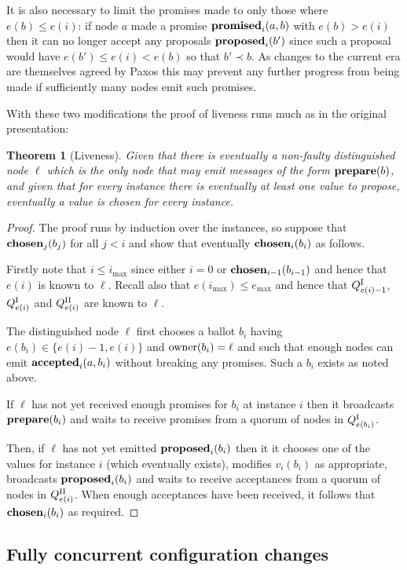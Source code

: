 \documentclass[journal]{IEEEtran}
\newtheorem{theorem}{Theorem}
\begin{document}
It is also necessary to limit the promises made to only those where $e(b) \le
e(i)$: if node $a$ made a promise $\mathbf{promised}_{i}(a,b)$ with $e(b) > e(i)$ then it
can no longer accept any proposals $\mathbf{proposed}_{i}(b')$ since such a proposal would
have $e(b') \le e(i) < e(b)$ so that $b' \prec b$. As changes to the current
era are themselves agreed by Paxos this may prevent any further progress from
being made if sufficiently many nodes emit such promises.

With these two modifications the proof of liveness runs much as in the original
presentation:

\begin{theorem}[Liveness] Given that there is eventually a non-faulty
distinguished node $\ell$ which is the only node that may emit messages of the
form $\mathbf{prepare}(b)$, and given that for every instance there is eventually at least
one value to propose, eventually a value is chosen for every instance.
\end{theorem}

\begin{proof} The proof runs by induction over the instances, so suppose that
$\mathbf{chosen}_{j}(b_j)$ for all $j < i$ and show that eventually $\mathbf{chosen}_{i}(b_i)$ as
follows.

Firstly note that $i \le i_{\mathrm{max}}$ since either $i = 0$ or
$\mathbf{chosen}_{i-1}(b_{i-1})$ and hence that $e(i)$ is known to $\ell$. Recall also
that $e(i_{\mathrm{max}}) \le e_{\mathrm{max}}$ and hence that ${Q}^\textrm{I}_{e(i)-1}$,
${Q}^\textrm{I}_{e(i)}$ and ${Q}^\textrm{II}_{e(i)}$ are known to $\ell$.

The distinguished node $\ell$ first chooses a ballot $b_i$ having $e(b_i) \in
\{ e(i) - 1, e(i) \}$ and $\mathrm{owner}(b_i) = \ell$ and such that enough nodes can
emit $\mathbf{accepted}_{i}(a,b_i)$ without breaking any promises. Such a $b_i$ exists as
noted above.

If $\ell$ has not yet received enough promises for $b_i$ at instance $i$ then
it broadcasts $\mathbf{prepare}(b_i)$ and waits to receive promises from a quorum of nodes
in ${Q}^\textrm{I}_{e(b_i)}$.

Then, if $\ell$ has not yet emitted $\mathbf{proposed}_{i}(b_i)$ then it it chooses one of
the values for instance $i$ (which eventually exists), modifies $v_i(b_i)$ as
appropriate, broadcasts $\mathbf{proposed}_{i}(b_i)$ and waits to receive acceptances from a
quorum of nodes in ${Q}^\textrm{II}_{e(i)}$. When enough acceptances have been received, it
follows that $\mathbf{chosen}_{i}(b_i)$ as required. \end{proof}

\subsection{Fully concurrent configuration changes}
\end{document}
